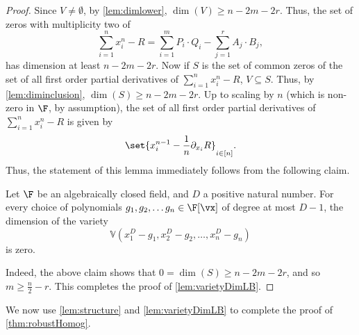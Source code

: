 \begin{proof}
	Since $V\neq\emptyset$, by \autoref{lem:dimlower}, $\dim(V)\ge n-2m-2r$.  Thus, the set of zeros with multiplicity two of 
	\[
		\sum_{i=1}^{n} x_i^n - R = \sum_{i=1}^{m} P_i \cdot Q_i - \sum_{j=1}^{r} A_j \cdot B_j, 
	\]
	has dimension at least $n - 2m - 2r$. Now if $S$ is the set of common zeros of the set of all first order partial derivatives of $\sum_{i=1}^n x_i^n-R$, $V\subseteq S$. Thus, by \autoref{lem:diminclusion}, $\dim(S)\ge n-2m-2r$. Up to scaling by $n$ (which is non-zero in $\F$, by assumption), the set of all first order partial derivatives of $\sum_{i=1}^{n} x_i^n - R$ is given by 
	\[
		\set{x_i^{n-1} - \frac{1}{n}\partial_{x_i}R}_{i \in [n]}.
	\]
	Thus, the statement of this lemma immediately follows from the following claim.
			
	\begin{claim}
		Let $\F$ be an algebraically closed field, and $D$ a positive natural number. For every choice of polynomials $g_1, g_2, \ldots g_n \in \F[\vx]$ of degree at most $D-1$, the dimension of the variety 
		\[\mathbb{V}(x_1^D - g_1, x_2^D - g_2, \ldots, x_n^D - g_n)\] is zero.
	\end{claim}
	Indeed, the above claim shows that $0 = \dim(S) \geq n-2m-2r$, and so $m \geq \frac{n}{2} - r$. This completes the proof of \autoref{lem:varietyDimLB}.
\end{proof}

We now use \autoref{lem:structure} and \autoref{lem:varietyDimLB} to complete the proof of \autoref{thm:robustHomog}.

